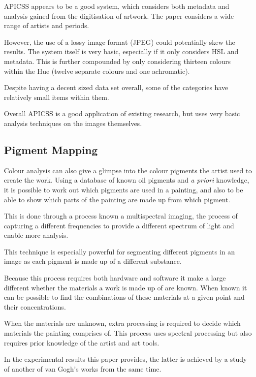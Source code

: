 \documentclass[conference]{IEEEtran}
\begin{document}
\gls{APICSS} appears to be a good system, which considers both metadata and
analysis gained from the digitisation of artwork. The paper considers a wide
range of artists and periods.

However, the use of a lossy image format (JPEG) could potentially skew the
results. The system itself is very basic, especially if it only considers
\gls{HSL} and metadata. This is further compounded by only considering thirteen
colours within the Hue (twelve separate colours and one achromatic).

Despite having a decent sized data set overall, some of the categories have
relatively small items within them.

Overall \gls{APICSS} is a good application of existing research, but uses very
basic analysis techniques on the images themselves.


\subsection{Pigment Mapping}
Colour analysis can also give a glimpse into the colour pigments the artist
used to create the work. Using a database of known oil pigments and
\textit{a priori} knowledge, it is possible to work out which pigments are used
in a painting, and also to be able to show which parts of the painting are made
up from which pigment\cite{zhao2008investigation}.

This is done through a process known a multispectral imaging, the process of
capturing a different frequencies to provide a different spectrum of light and
enable more analysis.

This technique is especially powerful for segmenting different pigments in an
image as each pigment is made up of a different substance.

Because this process requires both hardware and software it make a large
different whether the materials a work is made up of are known. When known it
can be possible to find the combinations of these materials at a given point
and their concentrations.

When the materials are unknown, extra processing is required to decide which
materials the painting comprises of. This process uses spectral processing but
also requires prior knowledge of the artist and art tools.

In the experimental results this paper provides, the latter is achieved by a
study of another of van Gogh's works from the same time.
\end{document}

